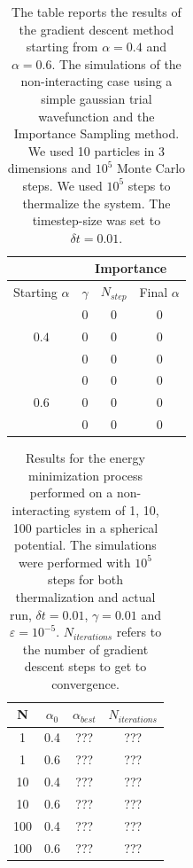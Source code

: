 \begin{table}[H]
\centering
 \begin{tabular}{c|c|c|c|}
         & \multicolumn{3}{c|}{Importance} \\
        \hline
         Starting $\alpha$ & $\gamma$ & $N_{step}$ & Final $\alpha$ \\
       \hline
          & $0$ & $0$ & $0$ \\
         $0.4$ & $0$ & $0$ & $0$ \\
          & $0$ & $0$ & $0$ \\
         \hline
          & $0$ & $0$ & $0$ \\
         $0.6$ & $0$ & $0$ & $0$ \\
          & $0$ & $0$ & $0$ \\
         \hline
    \end{tabular}
    \caption{The table reports the results of the gradient descent method starting from $\alpha=0.4$ and $\alpha=0.6$. The simulations of the non-interacting case using a simple gaussian trial wavefunction and the Importance Sampling method. We used 10 particles in 3 dimensions and $10^5$ Monte Carlo steps. We used $10^5$ steps to thermalize the system. The timestep-size was set to $\delta t= 0.01$. }
\end{table}

\begin{table}[H]
    \centering
    \begin{tabular}{cccc}
        N & $\alpha_0$ & $\alpha_{best}$ & $N_{iterations}$ \\
        \midrule
        1 & 0.4 & ??? & ??? \\
        1 & 0.6 & ??? & ??? \\
        10 & 0.4 & ??? & ??? \\
        10 & 0.6 & ??? & ??? \\
        100 & 0.4 & ??? & ??? \\
        100 & 0.6 & ??? & ??? \\
        \bottomrule
    \end{tabular}
    \caption{Results for the energy minimization process performed on a non-interacting system of 1, 10, 100 particles in a spherical potential. The simulations were performed with $10^5$ steps for both thermalization and actual run, $\delta t = 0.01$, $\gamma=0.01$ and $\varepsilon=10^{-5}$. $N_{iterations}$ refers to the number of gradient descent steps to get to convergence.}
    \label{tab:my_label}
\end{table}


